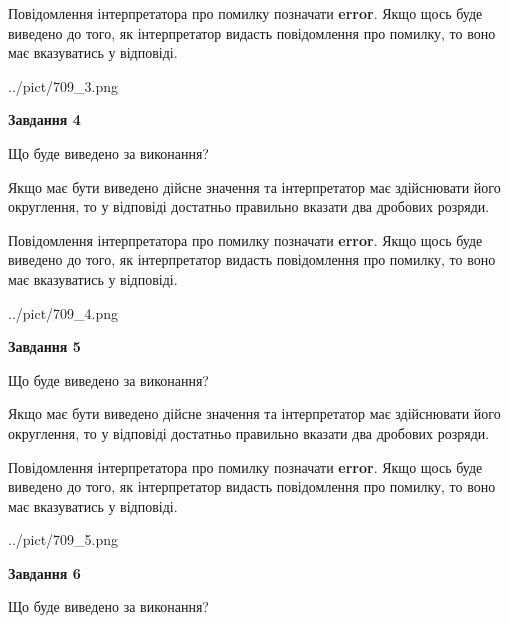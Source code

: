 \documentclass[12pt, ukrainian]{article}
\begin{document}
{\begin {Large}
Повідомлення інтерпретатора про помилку позначати \textbf{error}.
Якщо щось буде виведено до того, як інтерпретатор видасть повідомлення про помилку, 
то воно має вказуватись у відповіді. \par

\begin{center}
	{../pict/709_3.png}
\end{center}
\newpage

{\begin {center}\textbf{Завдання 4}\end {center}}\par
Що буде виведено за виконання? \par

Якщо має бути виведено дійсне значення та інтерпретатор має здійснювати його округлення, 
то у відповіді достатньо правильно вказати два дробових розряди.

Повідомлення інтерпретатора про помилку позначати \textbf{error}.
Якщо щось буде виведено до того, як інтерпретатор видасть повідомлення про помилку, 
то воно має вказуватись у відповіді. \par

\begin{center}
	{../pict/709_4.png}
\end{center}
\newpage

{\begin {center}\textbf{Завдання 5}\end {center}}\par
Що буде виведено за виконання? \par

Якщо має бути виведено дійсне значення та інтерпретатор має здійснювати його округлення, 
то у відповіді достатньо правильно вказати два дробових розряди.

Повідомлення інтерпретатора про помилку позначати \textbf{error}.
Якщо щось буде виведено до того, як інтерпретатор видасть повідомлення про помилку, 
то воно має вказуватись у відповіді. \par

\begin{center}
	{../pict/709_5.png}
\end{center}
\newpage

{\begin {center}\textbf{Завдання 6}\end {center}}\par
Що буде виведено за виконання? \par


\end{Large}}
\end{document}
